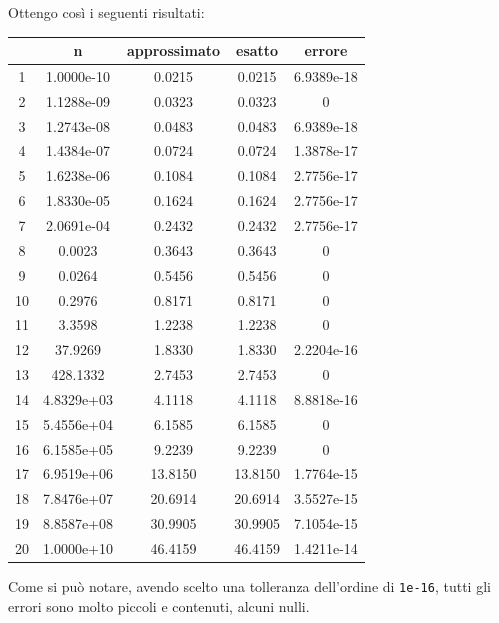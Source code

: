 \documentclass[12pt]{article}
\begin{document}
Ottengo così i seguenti risultati:
\begin{center}
    \begin{tabular}{||c | c | c | c | c||} 
        \hline
        & n & approssimato & esatto & errore\\
        \hline
        1 & 1.0000e-10 & 0.0215 & 0.0215 & 6.9389e-18\\
        \hline
        2 & 1.1288e-09 & 0.0323 & 0.0323 & 0\\
        \hline
        3 & 1.2743e-08 & 0.0483 & 0.0483 & 6.9389e-18\\
        \hline
        4 & 1.4384e-07 & 0.0724 & 0.0724 & 1.3878e-17\\
        \hline
        5 & 1.6238e-06 & 0.1084 & 0.1084 & 2.7756e-17\\
        \hline
        6 & 1.8330e-05 & 0.1624 & 0.1624 & 2.7756e-17\\
        \hline
        7 & 2.0691e-04 & 0.2432 & 0.2432 & 2.7756e-17\\
        \hline
        8 & 0.0023 & 0.3643 & 0.3643 & 0\\
        \hline
        9 & 0.0264 & 0.5456 & 0.5456 & 0\\
        \hline
        10 & 0.2976 & 0.8171 & 0.8171 & 0\\
        \hline
        11 & 3.3598 & 1.2238 & 1.2238 & 0\\
        \hline
        12 & 37.9269 & 1.8330 & 1.8330 & 2.2204e-16\\
        \hline
        13 & 428.1332 & 2.7453 & 2.7453 & 0\\
        \hline
        14 & 4.8329e+03 & 4.1118 & 4.1118 & 8.8818e-16\\
        \hline
        15 & 5.4556e+04 & 6.1585 & 6.1585 & 0\\
        \hline
        16 & 6.1585e+05 & 9.2239 & 9.2239 & 0\\
        \hline
        17 & 6.9519e+06 & 13.8150 & 13.8150 & 1.7764e-15\\
        \hline
        18 & 7.8476e+07 & 20.6914 & 20.6914 & 3.5527e-15\\
        \hline
        19 & 8.8587e+08 & 30.9905 & 30.9905 & 7.1054e-15\\
        \hline
        20 & 1.0000e+10 & 46.4159 & 46.4159 & 1.4211e-14\\
        \hline
    \end{tabular}
\end{center}
Come si può notare, avendo scelto una tolleranza dell'ordine di \texttt{1e-16}, tutti gli errori sono molto piccoli e contenuti, alcuni nulli.
\pagebreak
\end{document}
